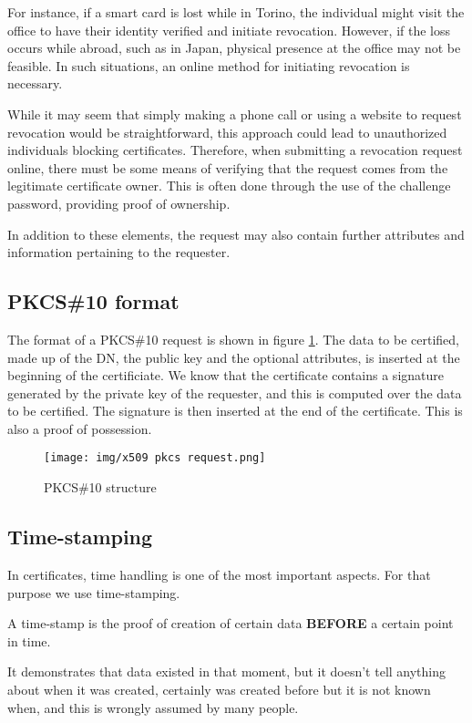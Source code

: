 For instance, if a smart card is lost while in Torino, the individual
might visit the office to have their identity verified and initiate
revocation. However, if the loss occurs while abroad, such as in Japan,
physical presence at the office may not be feasible. In such
situations, an online method for initiating revocation is necessary.

While it may seem that simply making a phone call or using a website to
request revocation would be straightforward, this approach could lead
to unauthorized individuals blocking certificates. Therefore, when
submitting a revocation request online, there must be some means of
verifying that the request comes from the legitimate certificate owner.
This is often done through the use of the challenge password, providing
proof of ownership.

In addition to these elements, the request may also contain further
attributes and information pertaining to the requester.

\subsection{PKCS\#10 format}
The format of a PKCS\#10 request is shown in figure 
\ref{fig:PKCS10 structure}. The data to be certified, made up of the
DN, the public key and the optional attributes, is inserted at the
beginning of the certificiate. We know that the certificate contains a
signature generated by the private key of the requester, and this is
computed over the data to be certified. The signature is then inserted
at the end of the certificate. This is also a proof of possession.

\begin{figure}[H]
  \centering
  \texttt{[image: img/x509 pkcs request.png]}

  \caption{PKCS\#10 structure}
  \label{fig:PKCS10 structure}
\end{figure}

\subsection{Time-stamping}
In certificates, time handling is one of the most important aspects.
For that purpose we use time-stamping.
\begin{boxH}
  A time-stamp is the proof of creation of certain data
  \textbf{BEFORE} a certain point in time.
\end{boxH}
It demonstrates that data existed in that moment, but it doesn’t tell
anything about when it was created, certainly was created before but
it is not known when, and this is wrongly assumed by many people.

